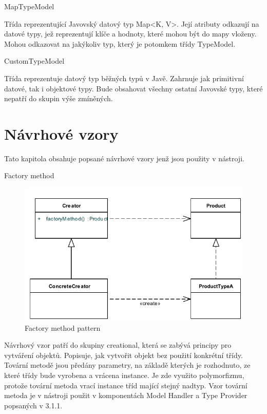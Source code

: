 \documentclass[11pt,twoside,a4paper]{book}
\begin{document}
MapTypeModel

Třída reprezentující Javovský datový typ Map<K, V>. Její atributy odkazují na datové typy,
jež reprezentují klíče a hodnoty, které mohou být do mapy vloženy. Mohou odkazovat na
jakýkoliv typ, který je potomkem třídy TypeModel.

CustomTypeModel

Třída reprezentuje datový typ běžných typů v Javě. Zahrnuje jak primitivní datové, tak i
objektové typy. Bude obsahovat všechny ostatní Javovské typy, které nepatří do skupin výše
zmíněných.

\section{Návrhové vzory}

Tato kapitola obsahuje popsané návrhové vzory jenž jsou použity v nástroji.

Factory method

\begin{figure}[h]
\begin{center}
\includegraphics[width=13cm]{images-pdf/Factory-Method-Design-Patternnew.pdf}
\caption{Factory method pattern}
\label{fig:logo}
\end{center}
\end{figure}

Návrhový vzor patří do skupiny creational, která se zabývá principy pro 
vytváření objektů. Popisuje, jak vytvořit objekt bez použití konkrétní třídy. 
Tovární metodě jsou předány parametry, na základě kterých je rozhodnuto, ze 
které třídy bude vyrobena a vrácena instance. Je zde využito polymorfizmu, 
protože tovární metoda vrací instance tříd mající stejný nadtyp. Vzor tovární 
metoda je v nástroji použit v komponentách Model Handler a Type Provider 
popsaných v 3.1.1.
\end{document}
